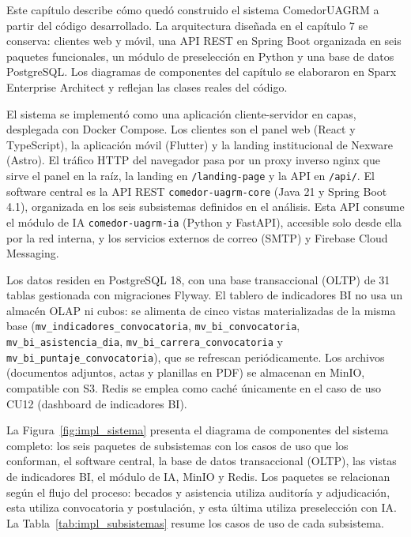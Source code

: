 \label{sec:cap8_arquitectura_sistema}

Este capítulo describe cómo quedó construido el sistema ComedorUAGRM a partir del código desarrollado. La arquitectura diseñada en el capítulo 7 se conserva: clientes web y móvil, una API REST en Spring Boot organizada en seis paquetes funcionales, un módulo de preselección en Python y una base de datos PostgreSQL. Los diagramas de componentes del capítulo se elaboraron en Sparx Enterprise Architect y reflejan las clases reales del código.

El sistema se implementó como una aplicación cliente-servidor en capas, desplegada con Docker Compose. Los clientes son el panel web (React y TypeScript), la aplicación móvil (Flutter) y la landing institucional de Nexware (Astro). El tráfico HTTP del navegador pasa por un proxy inverso nginx que sirve el panel en la raíz, la landing en \texttt{/landing-page} y la API en \texttt{/api/}. El software central es la API REST \texttt{comedor-uagrm-core} (Java 21 y Spring Boot 4.1), organizada en los seis subsistemas definidos en el análisis. Esta API consume el módulo de IA \texttt{comedor-uagrm-ia} (Python y FastAPI), accesible solo desde ella por la red interna, y los servicios externos de correo (SMTP) y Firebase Cloud Messaging.

Los datos residen en PostgreSQL 18, con una base transaccional (OLTP) de 31 tablas gestionada con migraciones Flyway. El tablero de indicadores BI no usa un almacén OLAP ni cubos: se alimenta de cinco vistas materializadas de la misma base (\texttt{mv\_indicadores\_convocatoria}, \texttt{mv\_bi\_convocatoria}, \texttt{mv\_bi\_asistencia\_dia}, \texttt{mv\_bi\_carrera\_convocatoria} y \texttt{mv\_bi\_puntaje\_convocatoria}), que se refrescan periódicamente. Los archivos (documentos adjuntos, actas y planillas en PDF) se almacenan en MinIO, compatible con S3. Redis se emplea como caché únicamente en el caso de uso CU12 (dashboard de indicadores BI).

La Figura~\ref{fig:impl_sistema} presenta el diagrama de componentes del sistema completo: los seis paquetes de subsistemas con los casos de uso que los conforman, el software central, la base de datos transaccional (OLTP), las vistas de indicadores BI, el módulo de IA, MinIO y Redis. Los paquetes se relacionan según el flujo del proceso: becados y asistencia utiliza auditoría y adjudicación, esta utiliza convocatoria y postulación, y esta última utiliza preselección con IA. La Tabla~\ref{tab:impl_subsistemas} resume los casos de uso de cada subsistema.

